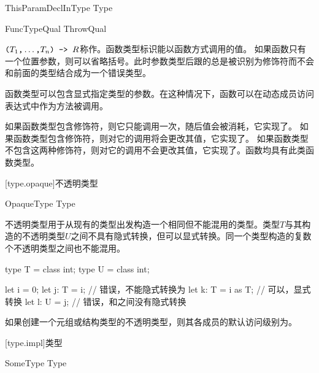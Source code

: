 \begin{bnf}{ThisParamDeclInType}
     \terminal{:} Type
\end{bnf}

\begin{bnf}{FuncTypeQual}
    ThrowQual \br
     \br
     \br
     \br
\end{bnf}

\pnum
$\texttt{(}T_1\texttt{,} \ldots\texttt{,} T_n\texttt{) -> }R$称作。函数类型标识能以函数方式调用的值。
如果函数只有一个位置参数，则可以省略括号。此时参数类型后跟的总是被识别为修饰符而不会和前面的类型结合成为一个错误类型。

\pnum
函数类型可以包含显式指定类型的参数。在这种情况下，函数可以在动态成员访问表达式中作为方法被调用。

\pnum
如果函数类型包含修饰符，则它只能调用一次，随后值会被消耗，它实现了。
如果函数类型包含修饰符，则对它的调用将会更改其值，它实现了。
如果函数类型不包含这两种修饰符，则对它的调用不会更改其值，它实现了。函数均具有此类函数类型。

[type.opaque]{不透明类型}

\begin{bnf}{OpaqueType}
     Type
\end{bnf}

\pnum
不透明类型用于从现有的类型出发构造一个相同但不能混用的类型。类型$T$与其构造的不透明类型$U$之间不具有隐式转换，但可以显式转换。同一个类型构造的复数个不透明类型之间也不能混用。

\enterexample
\begin{codeblock}

type T = class int;
type U = class int;

let i = 0;
let j: T = i; // 错误，不能隐式转换为
let k: T = i as T; // 可以，显式转换
let l: U = j; // 错误，和之间没有隐式转换

\end{codeblock}
\exitexample

\pnum
如果创建一个元组或结构类型的不透明类型，则其各成员的默认访问级别为。

[type.impl]{类型}

\begin{bnf}{SomeType}
     Type \br
     \terminal{_}
\end{bnf}


